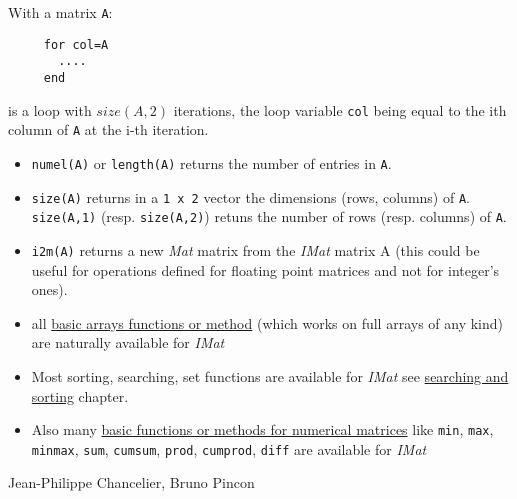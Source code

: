 
With a matrix \verb+A+:
\begin{verbatim}
     for col=A
       ....
     end
\end{verbatim} 
is a loop with $size(A,2)$ iterations, the loop 
variable  \verb+col+ being equal to the ith column of \verb+A+ at the i-th iteration.

\begin{itemize}
   \item \verb+numel(A)+ or \verb+length(A)+ returns the number of entries in \verb+A+.
   \item \verb+size(A)+ returns in a \verb+1 x 2+ vector the dimensions (rows, columns)
of \verb+A+. \verb+size(A,1)+ (resp. \verb+size(A,2)+) retuns the number of rows 
(resp. columns) of \verb+A+.
   \item \verb+i2m(A)+ returns a new \emph{Mat} matrix from the \emph{IMat} matrix A (this could be useful for
    operations defined for floating point matrices and not for integer's ones).  
   \item all \hyperlink{arrays}{basic arrays functions or method} (which works on full arrays of any kind) 
     are naturally available for \emph{IMat} 
    \item Most sorting, searching, set functions are available for \emph{IMat} see \hyperlink{searchandsort}{searching
      and sorting} chapter.
   \item Also many \hyperlink{basicnumarrays}{basic functions or methods for numerical matrices} like \verb+min+, 
      \verb+max+, \verb+minmax+, \verb+sum+, \verb+cumsum+, \verb+prod+,  \verb+cumprod+, \verb+diff+ are available
       for \emph{IMat}
\end{itemize}


\begin{authors}
   Jean-Philippe Chancelier, Bruno Pincon
\end{authors}
